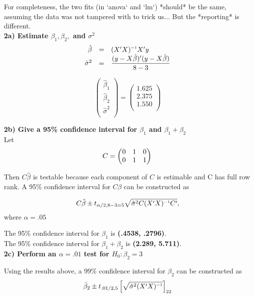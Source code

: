 \documentclass[11pt]{article}
\def\wl{\par \vspace{\baselineskip}\noindent}
\def\ds{\displaystyle}
\def\ds{\displaystyle}
\def\inv{^{\raisebox{.2ex}{$\scriptscriptstyle-1$}}}
\def\bk#1{\left[#1\right]}
\begin{document}
\noindent
For completeness, the two fits (in `anova` and `lm`) *should* be the same,
assuming the data was not tampered with to trick us... But the *reporting* is
different.\\


\noindent
\textbf{2a) Estimate $\beta_1,\beta_2,$ and $\sigma^2$}\\

$$
\begin{array}{rcl}
  \hat\beta &=& (X'X)\inv X'y\\
  \hat\sigma^2 &=& \ds\frac{(y-X\hat\beta)'(y-X\hat\beta)}{8-3}
\end{array}
$$

$$
\begin{pmatrix}
\hat\beta_1 \\
\hat\beta_2 \\
\hat\sigma^2 \\
\end{pmatrix} =
\begin{pmatrix}
1.625\\
2.375\\
1.550\\
\end{pmatrix}
$$
\wl

\noindent
\textbf{2b) Give a 95\% confidence interval for $\beta_1$ and $\beta_1 + \beta_2$}\\

\noindent Let
$$
  C = \begin{pmatrix}
    0 & 1 & 0 \\
    0 & 1 & 1 \\
  \end{pmatrix}\\
$$

\noindent
Then $C\hat\beta$ is testable because each component of $C$ is estimable and C
has full row rank. A 95\% confidence interval for $C\beta$ can be constructed
as

$$
C\hat\beta \pm t_{\alpha/2,8-3=5}\sqrt{\hat\sigma^2C(X'X)\inv C'},
$$
where $\alpha = .05$ 

\noindent
The 95\% confidence interval for $\beta_1$ is \textbf{(.4538, .2796)}.\\
\noindent
The 95\% confidence interval for $\beta_1+\beta_2$ is \textbf{(2.289, 5.711)}.\\


\noindent
\textbf{2c)  Perform an $\alpha = .01$ test for $H_0: \beta_2 = 3$}

\noindent
Using the results above, a 99\% confidence interval for $\beta_2$ can be
constructed as
$$
\hat\beta_2 \pm t_{.01/2,5} \bk{\sqrt{\hat\sigma^2(X'X)\inv}}_{22}
$$
\end{document}
